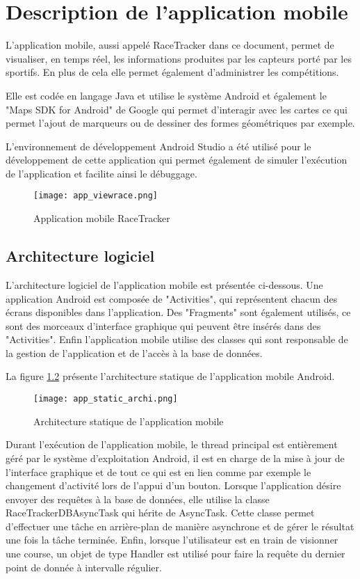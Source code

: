 \chapter{Description de l'application mobile}\label{ch:app_mobile}

L'application mobile, aussi appelé RaceTracker dans ce document, permet de visualiser, en temps réel, les informations produites par les capteurs porté par les sportifs. En plus de cela elle permet également d'administrer les compétitions.

Elle est codée en langage Java et utilise le système Android et également le "Maps SDK for Android" de Google qui permet d'interagir avec les cartes ce qui permet l'ajout de marqueurs ou de dessiner des formes géométriques par exemple.

L'environnement de développement Android Studio a été utilisé pour le développement de cette application qui permet également de simuler l'exécution de l'application et facilite ainsi le débuggage.

\begin{figure}[htb]
\centering 
\texttt{[image: app\_viewrace.png]} 
\caption{Application mobile RaceTracker}
\label{fig:app_viewrace}
\end{figure}

\section{Architecture logiciel}

L'architecture logiciel de l'application mobile est présentée ci-dessous. Une application Android est composée de "Activities", qui représentent chacun des écrans disponibles dans l'application. Des "Fragments" sont également utilisés, ce sont des morceaux d'interface graphique qui peuvent être insérés dans des "Activities". Enfin l'application mobile utilise des classes qui sont responsable de la gestion de l'application et de l'accès à la base de données.

La figure \ref{fig:app_static_archi} présente l'architecture statique de l'application mobile Android.

\begin{figure}[htb]
\centering 
\texttt{[image: app\_static\_archi.png]} 
\caption{Architecture statique de l'application mobile}
\label{fig:app_static_archi}
\end{figure}

Durant l'exécution de l'application mobile, le thread principal est entièrement géré par le système d'exploitation Android, il est en charge de la mise à jour de l'interface graphique et de tout ce qui est en lien comme par exemple le changement d'activité lors de l'appui d'un bouton. Lorsque l'application désire envoyer des requêtes à la base de données, elle utilise la classe RaceTrackerDBAsyncTask qui hérite de AsyncTask. Cette classe permet d'effectuer une tâche en arrière-plan de manière asynchrone et de gérer le résultat une fois la tâche terminée. Enfin, lorsque l'utilisateur est en train de visionner une course, un objet de type Handler est utilisé pour faire la requête du dernier point de donnée à intervalle régulier.

